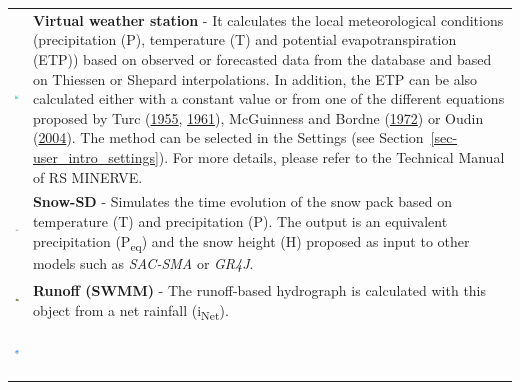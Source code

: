 \documentclass[
  letterpaper,
  DIV=11,
  numbers=noendperiod]{scrreprt}
\begin{document}
\begin{longtable}[]{@{}
  >{\raggedright\arraybackslash}p{}
  >{\raggedright\arraybackslash}p{}@{}}
\toprule()
\endhead
\includegraphics[width=0.44in,height=0.44in]{./figures/fig-icon_object_station.png}
& \textbf{Virtual weather station} - It calculates the local
meteorological conditions (precipitation (P), temperature (T) and
potential evapotranspiration (ETP)) based on observed or forecasted data
from the database and based on Thiessen or Shepard interpolations. In
addition, the ETP can be also calculated either with a constant value or
from one of the different equations proposed by Turc
(\protect\hyperlink{ref-turc_bilan_1955}{1955},
\protect\hyperlink{ref-turc_evaluation_1961}{1961}), McGuinness and
Bordne (\protect\hyperlink{ref-mcguinness_comparison_1972}{1972}) or
Oudin (\protect\hyperlink{ref-oudin_recherche_2004}{2004}). The method
can be selected in the Settings (see
Section~\ref{sec-user_intro_settings}). For more details, please refer
to the Technical Manual of RS MINERVE. \\
\includegraphics[width=0.44in,height=0.44in]{./figures/fig-icon_object_snow.png}
& \textbf{Snow-SD} - Simulates the time evolution of the snow pack based
on temperature (T) and precipitation (P). The output is an equivalent
precipitation (P\textsubscript{eq}) and the snow height (H) proposed as
input to other models such as \emph{SAC-SMA} or \emph{GR4J}. \\
\includegraphics[width=0.44in,height=0.44in]{./figures/fig-icon_object_swmm.png}
& \textbf{Runoff (SWMM)} - The runoff-based hydrograph is calculated
with this object from a net rainfall (i\textsubscript{Net}). \\
\includegraphics[width=0.44in,height=0.44in]{./figures/fig-icon_object_gsm.png}

\end{longtable}
\end{document}
